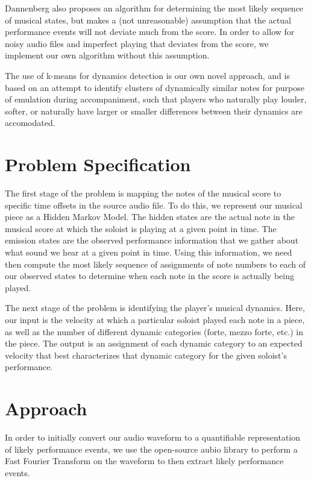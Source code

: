 \documentclass[11pt]{article}
\begin{document}
Dannenberg \cite{dannenberg} also proposes an algorithm for determining
the most likely sequence of musical states, but makes a (not unreasonable)
assumption that the actual performance events will not deviate much
from the score. In order to allow for noisy audio files and imperfect
playing that deviates from the score, we implement our own algorithm
without this assumption.

The use of k-means for dynamics detection is our own novel approach,
and is based on an attempt to identify clusters of dynamically
similar notes for purpose of emulation during accompaniment,
such that players who naturally play louder, softer, or naturally
have larger or smaller differences between their dynamics are
accomodated.

\section{Problem Specification}

The first stage of the problem is mapping the notes of the musical
score to specific time offsets in the source audio file.
To do this, we represent our musical piece as a Hidden Markov Model.
The hidden states are the actual note in the musical score at which
the soloist is playing at a given point in time. The emission states
are the observed performance information that we gather about what sound
we hear at a given point in time. Using this information, we need then
compute the most likely sequence of assignments of note numbers to
each of our observed states to determine when each note in the score
is actually being played.

The next stage of the problem is identifying the player's
musical dynamics. Here, our input is the velocity at which a particular
soloist played each note in a piece, as well as the number of different
dynamic categories (forte, mezzo forte, etc.) in the piece. The output
is an assignment of each dynamic category to an expected velocity
that best characterizes that dynamic category for the given soloist's
performance.

\section{Approach}

In order to initially convert our audio waveform to a quantifiable
representation of likely performance events, we use the open-source
aubio library to perform a Fast Fourier Transform on the waveform
to then extract likely performance events.
\end{document}
